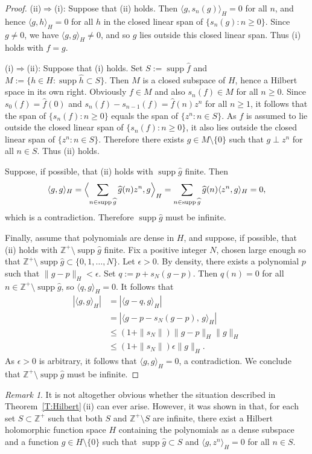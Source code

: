 \documentclass[11pt,reqno]{amsart}
\theoremstyle{plain}
\theoremstyle{definition}
\theoremstyle{remark}
\newtheorem*{remark}{Remark}
\newcommand{\ZZ}{\mathbb{Z}}
\renewcommand{\hat}{\widehat}
\DeclareMathOperator{\supp}{supp}
\begin{document}
\begin{proof}
(ii)$\Rightarrow$(i): Suppose that (ii) holds.
Then $\langle g,s_n(g)\rangle_H=0$ for all $n$, and hence
$\langle g,h\rangle_H=0$ for all $h$ in the closed linear span of $\{s_n(g):n\ge0\}$. 
Since $g\ne0$, we have $\langle g,g\rangle_H\ne0$, and so $g$ lies outside this closed linear span.
Thus (i) holds with $f=g$.

(i)$\Rightarrow$(ii): Suppose that (i) holds. Set $S:=\supp\hat{f}$ and
$M:=\{h\in H: \supp \hat{h}\subset S\}$.
Then $M$ is a closed subspace of $H$, hence a Hilbert space in its own right.
Obviously $f\in M$ and also $s_n(f)\in M$ for all $n\ge0$. Since $s_0(f)=\hat{f}(0)$ and $s_n(f)-s_{n-1}(f)=\hat{f}(n)z^n$ for all $n\ge1$,
it follows that the span of $\{s_n(f):n\ge0\}$ equals the span of $\{z^n:n\in S\}$.
As $f$ is assumed to lie outside the closed linear span of $\{s_n(f):n\ge0\}$,
it also lies outside the closed linear span of $\{z^n:n\in S\}$. Therefore 
there exists $g\in M\setminus\{0\}$ such that $g\perp z^n$ for all $n\in S$.
Thus (ii) holds.


Suppose, if possible, that (ii) holds with $\supp\hat{g}$ finite. Then
\[
\langle g,g\rangle_H
=\Bigl\langle \sum_{n\in \supp\hat{g}}\hat{g}(n)z^n,g\Bigr\rangle_H
=\sum_{n\in \supp\hat{g}}\hat{g}(n)\langle z^n, g\rangle_H=0,
\]
which is a contradiction. Therefore $\supp\hat{g}$ must be infinite.

Finally, assume that polynomials are dense in $H$, and suppose,
 if possible, that (ii) holds with $\ZZ^+\setminus \supp\hat{g}$ finite.
Fix  a positive integer $N$, chosen large enough so that 
$\ZZ^+\setminus \supp\hat{g}\subset\{0,1,\dots, N\}$. 
Let $\epsilon>0$. By density, there exists a polynomial $p$ such that $\|g-p\|_H<\epsilon$. 
Set $q:=p+s_N(g-p)$. Then $\hat{q}(n)=0$ for all $n\in \ZZ^+\setminus \supp\hat{g}$,
so $\langle q,g\rangle_H=0$. It follows that
\begin{align*}
|\langle g,g\rangle_H|
&=|\langle g-q,g\rangle_H|\\
&=|\langle g-p-s_N(g-p),\,g\rangle_H|\\
&\le (1+\|s_N\|)\|g-p\|_H\|g\|_H\\
&\le (1+\|s_N\|)\epsilon\|g\|_H.
\end{align*}
As $\epsilon>0$ is arbitrary, 
it follows that $\langle g,g\rangle_H=0$, a contradiction. 
We conclude that $\ZZ^+\setminus \supp\hat{g}$ must be infinite.
\end{proof}


\begin{remark}
It is not altogether obvious whether the situation described in Theorem~\ref{T:Hilbert}\,(ii) can ever arise. 
However, it was shown in \cite[Theorem~3.1]{MPR22a} that, for each set $S\subset\ZZ^+$ such that both $S$ and $\ZZ^+\setminus S$
are infinite, there exist a Hilbert holomorphic function space $H$ containing the polynomials as a dense subspace and a
function $g\in H\setminus\{0\}$ such that $\supp\hat{g}\subset S$ and $\langle g,z^n\rangle_H=0$ for all $n\in S$.
\end{remark}
\end{document}

